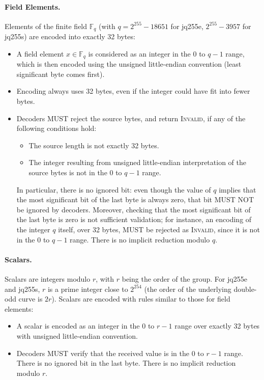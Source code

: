 \documentclass{llncs}
\newcommand{\bF}{\mathbb{F}}
\begin{document}
\paragraph{Field Elements.}
Elements of the finite field $\bF_q$ (with $q = 2^{255} - 18651$ for
jq255e, $2^{255} - 3957$ for jq255s) are encoded into exactly 32 bytes:
\begin{itemize}

    \item A field element $x \in \bF_q$ is considered as an integer
    in the $0$ to $q-1$ range, which is then encoded using the unsigned
    little-endian convention (least significant byte comes first).

    \item Encoding always uses 32 bytes, even if the integer could have
    fit into fewer bytes.

    \item Decoders MUST reject the source bytes, and return \textsc{Invalid},
    if any of the following conditions hold:
    \begin{itemize}

        \item The source length is not exactly 32 bytes.

        \item The integer resulting from unsigned little-endian
        interpretation of the source bytes is not in the $0$ to $q-1$
        range.

    \end{itemize}
    In particular, there is no ignored bit: even though the value of $q$
    implies that the most significant bit of the last byte is always zero,
    that bit MUST NOT be ignored by decoders. Moreover, checking that the
    most significant bit of the last byte is zero is not sufficient
    validation; for instance, an encoding of the integer $q$ itself, over
    32 bytes, MUST be rejected as \textsc{Invalid}, since it is not in the
    $0$ to $q-1$ range. There is no implicit reduction modulo $q$.

\end{itemize}

\paragraph{Scalars.}
Scalars are integers modulo $r$, with $r$ being the order of the group.
For jq255e and jq255s, $r$ is a prime integer close to $2^{254}$ (the
order of the underlying double-odd curve is $2r$). Scalars are encoded
with rules similar to those for field elements:
\begin{itemize}

    \item A scalar is encoded as an integer in the $0$ to $r-1$ range
    over exactly 32 bytes with unsigned little-endian convention.

    \item Decoders MUST verify that the received value is in the $0$
    to $r-1$ range. There is no ignored bit in the last byte. There
    is no implicit reduction modulo $r$.

\end{itemize}
\end{document}
